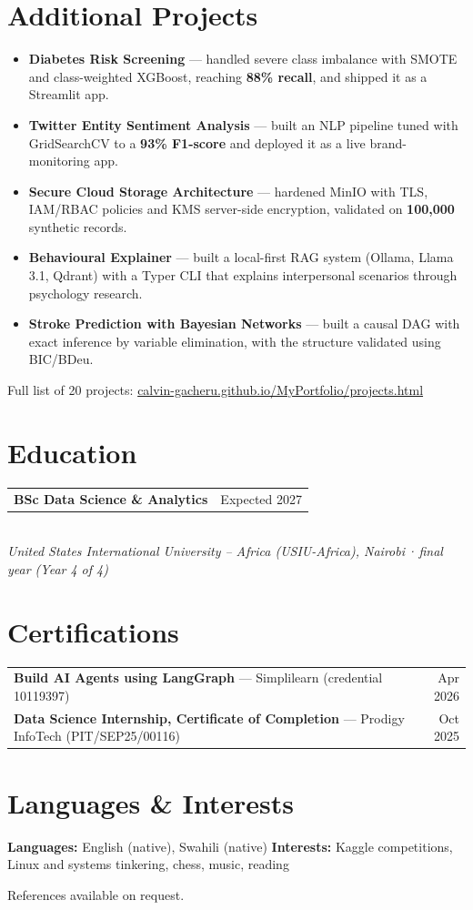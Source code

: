 \documentclass[10pt,a4paper]{article}
\makeatletter
\newcommand{\sep}{\hspace{0.45em}{\color{rule}|}\hspace{0.45em}}
\newcommand{\meta}[1]{{\color{muted}#1}}
\newcommand{\entry}[3]{%
  \begin{tabularx}{\linewidth}{@{}X r@{}}
    {\fontsize{10.5}{12.5}\selectfont\bfseries #1} & \meta{#2} \\
  \end{tabularx}\\[-1pt]
  {\color{muted}\itshape #3}\par
}
\makeatother
\begin{document}
\section{Additional Projects}
\begin{itemize}
  \item \textbf{Diabetes Risk Screening} — handled severe class imbalance with SMOTE and class-weighted XGBoost, reaching \textbf{88\% recall}, and shipped it as a Streamlit app.
  \item \textbf{Twitter Entity Sentiment Analysis} — built an NLP pipeline tuned with GridSearchCV to a \textbf{93\% F1-score} and deployed it as a live brand-monitoring app.
  \item \textbf{Secure Cloud Storage Architecture} — hardened MinIO with TLS, IAM/RBAC policies and KMS server-side encryption, validated on \textbf{100,000} synthetic records.
  \item \textbf{Behavioural Explainer} — built a local-first RAG system (Ollama, Llama 3.1, Qdrant) with a Typer CLI that explains interpersonal scenarios through psychology research.
  \item \textbf{Stroke Prediction with Bayesian Networks} — built a causal DAG with exact inference by variable elimination, with the structure validated using BIC/BDeu.
\end{itemize}
\meta{\small Full list of 20 projects: \href{https://calvin-gacheru.github.io/MyPortfolio/projects.html}{\color{accent}calvin-gacheru.github.io/MyPortfolio/projects.html}}

\section{Education}
\entry{BSc Data Science \& Analytics}{Expected 2027}{United States International University – Africa (USIU-Africa), Nairobi\,·\,final year (Year 4 of 4)}

\section{Certifications}
\begin{tabularx}{\linewidth}{@{}X r@{}}
\textbf{Build AI Agents using LangGraph} — Simplilearn \meta{(credential 10119397)} & \meta{Apr 2026} \\[1.5pt]
\textbf{Data Science Internship, Certificate of Completion} — Prodigy InfoTech \meta{(PIT/SEP25/00116)} & \meta{Oct 2025} \\
\end{tabularx}

\section{Languages \& Interests}
\textbf{Languages:} English (native), Swahili (native)\sep
\textbf{Interests:} Kaggle competitions, Linux and systems tinkering, chess, music, reading\par
\vspace{4pt}
\meta{\small References available on request.}
\end{document}
